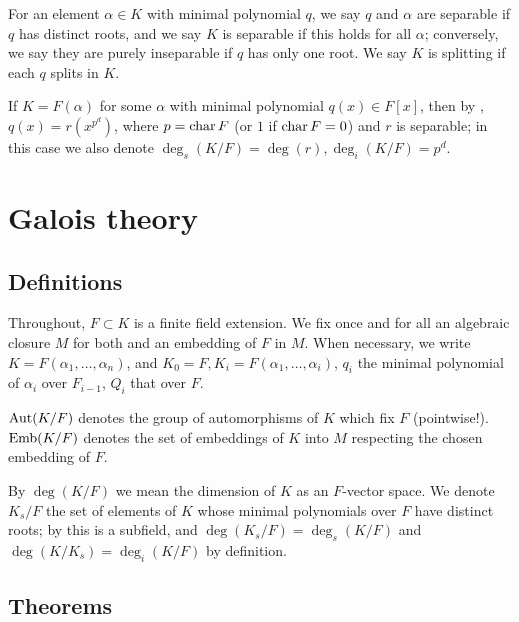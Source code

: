 \begin{definition} For an element $\alpha \in K$ with minimal polynomial $q$, we say
$q$ and $\alpha$ are separable if $q$ has distinct roots, and we say $K$ is
separable if this holds for all $\alpha$; conversely, we say they are purely
inseparable if $q$ has only one root.  We say $K$ is splitting if each $q$
splits in $K$.
\label{def:sepsplit}
\end{definition}


\begin{definition} If $K = F(\alpha)$ for some $\alpha$ with minimal polynomial
$q(x) \in F[x]$, then by , $q(x) = r(x^{p^d})$, where $p =
\operatorname{\text{char}}{F}$ (or $1$ if $\operatorname{\text{char}}{F} = 0$) and $r$ is separable; in this case we
also denote $\deg_s(K/F) = \deg(r), \deg_i(K/F) = p^d$.  \label{def:prim_sep}
\end{definition}


\section{Galois theory}
\subsection{Definitions}

Throughout, $F \subset K$ is a finite field extension.  We fix once and for
all an algebraic closure $M$ for both and an embedding of $F$ in $M$.  When
necessary, we write $K = F(\alpha_1, \dots, \alpha_n)$, and $K_0 = F, K_i =
F(\alpha_1, \dots, \alpha_i)$, $q_i$ the minimal polynomial of $\alpha_i$ over
$F_{i - 1}$, $Q_i$ that over $F$.

\begin{definition} $\operatorname{\text{Aut}}(K/F)$ denotes the group of automorphisms of $K$ which fix
$F$ (pointwise!).  $\operatorname{\text{Emb}}(K/F)$ denotes the set of embeddings of $K$ into $M$
respecting the chosen embedding of $F$.
\label{def:gal}
\end{definition}

\begin{definition} By $\deg(K/F)$ we mean the dimension of $K$ as an $F$-vector
space.  We denote $K_s/F$ the set of elements of $K$ whose minimal polynomials
over $F$ have distinct roots; by  this is a subfield, and
$\deg(K_s/F) = \deg_s(K/F)$ and $\deg(K/K_s) = \deg_i(K/F)$ by definition.
\label{def:sep}
\end{definition}
\subsection{Theorems}

